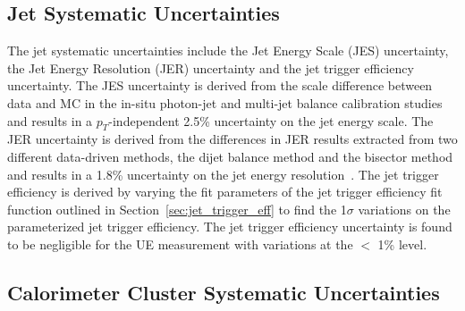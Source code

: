 \subsection{Jet Systematic Uncertainties}
The jet systematic uncertainties include the Jet Energy Scale (JES) uncertainty, the Jet Energy Resolution (JER) uncertainty and the jet trigger efficiency uncertainty.
The JES uncertainty is derived from the scale difference between data and MC in the in-situ photon-jet and multi-jet balance calibration studies~\cite{in_situ_note} and results in a $p_{T}$-independent 2.5\% uncertainty on the jet energy scale. 
The JER uncertainty is derived from the differences in JER results extracted from two different data-driven methods, the dijet balance method and the bisector method and results in a 1.8\% uncertainty on the jet energy resolution~\cite{ppg08AN}.
The jet trigger efficiency is derived by varying the fit parameters of the jet trigger efficiency fit function outlined in Section~\ref{sec:jet_trigger_eff} to find the 1$\sigma$ variations on the parameterized jet trigger efficiency. The jet trigger efficiency uncertainty is found to be negligible for the UE measurement with variations at the $<$ 1\% level.

\subsection{Calorimeter Cluster Systematic Uncertainties}

